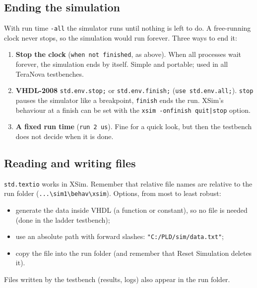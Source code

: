 \documentclass[11pt,a4paper]{article}
\newcommand{\code}[1]{\texttt{#1}}
\newcommand{\bs}{\textbackslash\allowbreak{}}
\renewcommand{\_}{\oldunderscore\allowbreak{}}
\newcommand{\menu}[1]{\textsf{#1}}
\begin{document}
\subsection{Ending the simulation}\label{sec:end}
With run time \code{-all} the simulator runs until nothing is left to do. A free-running clock never stops, so the simulation would run forever. Three ways to end it:
\begin{enumerate}[nosep]
  \item \textbf{Stop the clock} (\code{when not finished}, as above). When all processes wait forever, the simulation ends by itself. Simple and portable; used in all TeraNova testbenches.
  \item \textbf{VHDL-2008} \code{std.env.stop;} or \code{std.env.finish;} (\code{use std.env.all;}). \code{stop} pauses the simulator like a breakpoint, \code{finish} ends the run. XSim's behaviour at a finish can be set with the \code{xsim -onfinish quit|stop} option.
  \item \textbf{A fixed run time} (\code{run 2 us}). Fine for a quick look, but then the testbench does not decide when it is done.
\end{enumerate}

\subsection{Reading and writing files}\label{sec:files}
\code{std.textio} works in XSim. Remember that relative file names are relative to the run folder (\code{...\bs sim\_1\bs behav\bs xsim}). Options, from most to least robust:
\begin{itemize}[nosep]
  \item generate the data inside VHDL (a function or constant), so no file is needed (done in the ladder testbench);
  \item use an absolute path with forward slashes: \code{"C:/PLD/sim/data.txt"};
  \item copy the file into the run folder (and remember that \menu{Reset Simulation} deletes it).
\end{itemize}
Files written by the testbench (results, logs) also appear in the run folder.
\end{document}
